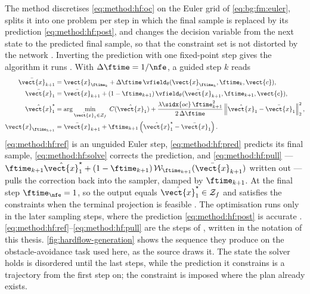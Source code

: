 The method discretises \eqref{eq:method:hf:oc} on the Euler grid of \eqref{eq:bg:fm:euler}, splits it into
one problem per step in which the final sample is replaced by its prediction
\eqref{eq:method:hf:post}, and changes the decision variable from the next state to the predicted final
sample, so that the constraint set is not distorted by the network \parencite[Problems~2--5]{li2025hardflow}.
Inverting the prediction with one fixed-point step gives the algorithm it runs
\parencite[Algorithm~1]{li2025hardflow}. With $\Delta\ftime = 1/\nfe$, a guided step $k$ reads
\begin{align}
  \bar{\vect{x}}_{k+1} &= \vect{x}_{\ftime_{k}}
    + \Delta\ftime\,\vfield_{\theta}(\vect{x}_{\ftime_{k}},\ftime_{k},\vect{c}),
    \label{eq:method:hf:ref}\\
  \bar{\vect{x}}_{1} &= \bar{\vect{x}}_{k+1}
    + (1-\ftime_{k+1})\,\vfield_{\theta}(\bar{\vect{x}}_{k+1},\ftime_{k+1},\vect{c}),
    \label{eq:method:hf:pred}\\
  \hat{\vect{x}}_{1}^{\star} &= \arg\min_{\hat{\vect{x}}_{1}\in\mathcal{Z}_{f}}\;
    C(\hat{\vect{x}}_{1})
    + \frac{\lambda\sidx{oc}\,\ftime_{k+1}^{2}}{2\,\Delta\ftime}\left\|\hat{\vect{x}}_{1}-\bar{\vect{x}}_{1}\right\|_{2}^{2},
    \label{eq:method:hf:solve}\\
  \vect{x}_{\ftime_{k+1}} &= \bar{\vect{x}}_{k+1} + \ftime_{k+1}\left(\hat{\vect{x}}_{1}^{\star}-\bar{\vect{x}}_{1}\right).
    \label{eq:method:hf:pull}
\end{align}
\eqref{eq:method:hf:ref} is an unguided Euler step, \eqref{eq:method:hf:pred} predicts its final sample,
\eqref{eq:method:hf:solve} corrects the prediction, and \eqref{eq:method:hf:pull} ---
$\ftime_{k+1}\hat{\vect{x}}_{1}^{\star} + (1-\ftime_{k+1})\,\mathcal{W}_{\ftime_{k+1}}(\bar{\vect{x}}_{k+1})$
written out --- pulls the correction back into the sampler, damped by $\ftime_{k+1}$. At the final step
$\ftime_{\nfe} = 1$, so the output equals $\hat{\vect{x}}_{1}^{\star}\in\mathcal{Z}_{f}$ and satisfies the
constraints when the terminal projection is feasible \parencite[Prop.~1]{li2025hardflow}. The optimisation runs only in the later sampling
steps, where the prediction \eqref{eq:method:hf:post} is accurate \parencite{li2025hardflow}.
\eqref{eq:method:hf:ref}--\eqref{eq:method:hf:pull} are the steps of
\parencite[Alg.~1]{li2025hardflow}, written in the notation of this thesis.
\autoref{fig:hardflow-generation} shows the sequence they produce on the obstacle-avoidance task
used here, as the source draws it. The state the solver holds is disordered until the last steps,
while the prediction it constrains is a trajectory from the first step on; the constraint is
imposed where the plan already exists.

